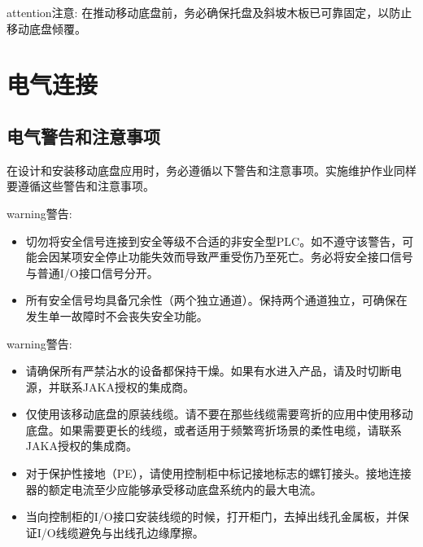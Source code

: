 \documentclass[a4paper,11pt,english,openany,oneside]{sphinxmanual}
\begin{document}
\begin{sphinxadmonition}{attention}{注意:}
\sphinxAtStartPar
在推动移动底盘前，务必确保托盘及斜坡木板已可靠固定，以防止移动底盘倾覆。
\end{sphinxadmonition}


\section{电气连接}
\label{\detokenize{08 _u5b89_u88c5_u4e0e_u8c03_u8bd5:id11}}\label{\detokenize{08 _u5b89_u88c5_u4e0e_u8c03_u8bd5:id12}}

\subsection{电气警告和注意事项}
\label{\detokenize{08 _u5b89_u88c5_u4e0e_u8c03_u8bd5:id13}}\label{\detokenize{08 _u5b89_u88c5_u4e0e_u8c03_u8bd5:id14}}
\sphinxAtStartPar
在设计和安装移动底盘应用时，务必遵循以下警告和注意事项。实施维护作业同样要遵循这些警告和注意事项。

\begin{sphinxadmonition}{warning}{警告:}\begin{itemize}
\item {} 
\sphinxAtStartPar
切勿将安全信号连接到安全等级不合适的非安全型PLC。如不遵守该警告，可能会因某项安全停止功能失效而导致严重受伤乃至死亡。务必将安全接口信号与普通I/O接口信号分开。

\item {} 
\sphinxAtStartPar
所有安全信号均具备冗余性（两个独立通道）。保持两个通道独立，可确保在发生单一故障时不会丧失安全功能。

\end{itemize}
\end{sphinxadmonition}

\begin{sphinxadmonition}{warning}{警告:}\begin{itemize}
\item {} 
\sphinxAtStartPar
请确保所有严禁沾水的设备都保持干燥。如果有水进入产品，请及时切断电源，并联系JAKA授权的集成商。

\item {} 
\sphinxAtStartPar
仅使用该移动底盘的原装线缆。请不要在那些线缆需要弯折的应用中使用移动底盘。如果需要更长的线缆，或者适用于频繁弯折场景的柔性电缆，请联系JAKA授权的集成商。

\item {} 
\sphinxAtStartPar
对于保护性接地（PE），请使用控制柜中标记接地标志的螺钉接头。接地连接器的额定电流至少应能够承受移动底盘系统内的最大电流。

\item {} 
\sphinxAtStartPar
当向控制柜的I/O接口安装线缆的时候，打开柜门，去掉出线孔金属板，并保证I/O线缆避免与出线孔边缘摩擦。

\end{itemize}
\end{sphinxadmonition}
\end{document}
